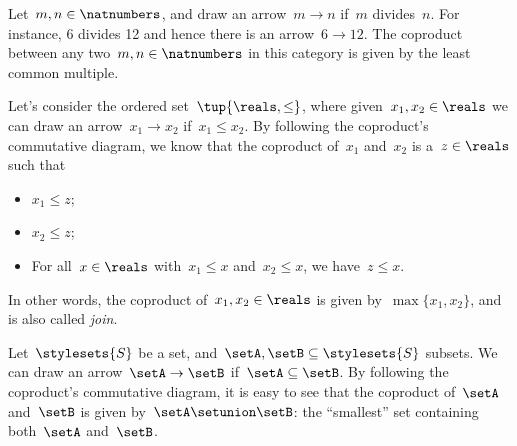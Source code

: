 \begin{example}
    Let~$m,n\in \natnumbers$, and draw an arrow~$m\to n$ if~$m$ divides~$n$.
    For instance, 6 divides 12 and hence there is an arrow~$6\to 12$.
    The coproduct between any two~$m,n\in \natnumbers$ in this category is given by the least common multiple.
\end{example}

\begin{example}
    Let's consider the ordered set~$\tup{\reals,\leq}$, where given~$x_1,x_2\in \reals$ we can draw an arrow~$x_1\to x_2$ if~$x_1\leq x_2$.
    By following the coproduct's commutative diagram, we know that the coproduct of~$x_1$ and~$x_2$ is a~$z\in \reals$ such that
    \begin{itemize}
        \item $x_1\leq z$;
        \item $x_2\leq z$;
        \item For all~$x\in \reals$ with~$x_1\leq x$ and~$x_2\leq x$, we have~$z\leq x$.
    \end{itemize}
    In other words, the coproduct of~$x_1,x_2\in \reals$ is given by~$\max\{x_1,x_2\}$, and is also called \emph{join}.
\end{example}

\begin{example}
    \label{ex:subset_coprod}
    Let~$\stylesets{S}$ be a set, and~$\setA,\setB\subseteq \stylesets{S}$ subsets.
    We can draw an arrow~$\setA\to \setB$ if~$\setA\subseteq \setB$.
    By following the coproduct's commutative diagram, it is easy to see that the coproduct of~$\setA$ and~$\setB$ is given by~$\setA\setunion\setB$: the ``smallest'' set containing both~$\setA$ and~$\setB$.
\end{example}

